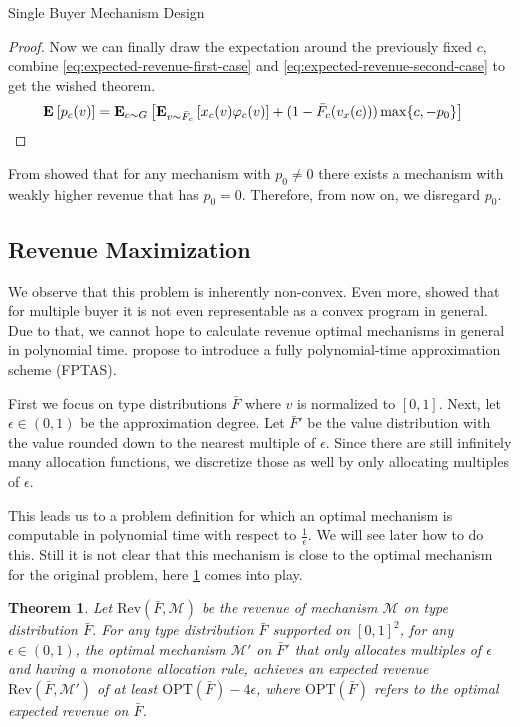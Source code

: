 \documentclass[11pt,a4paper]{article}
\newtheorem{theorem}{Theorem}
\newcommand{\Ex}[2][]{\mbox{\rm\bf E}_{#1}\left[#2\right]}
\newcommand{\1}[1]{\mbox{\rm\bf 1}_{#1}}
\begin{document}
\begin{section}{Single Buyer Mechanism Design}
\begin{proof}
     Now we can finally draw the expectation around the previously fixed $c$, combine \cref{eq:expected-revenue-first-case} and \cref{eq:expected-revenue-second-case} to get the wished theorem.
     \begin{align*}
         \Ex{p_c(v)} & = \Ex[c \sim G]{\Ex[v \sim \bar{F}_c]{x_c(v) \varphi_c(v)} + (1 - \bar{F}_{c}(v_x(c))) \max\{c, -p_0\} }
     \end{align*}
 \end{proof}

 From \citet{primary} showed that for any mechanism with $p_0 \neq 0$ there exists a mechanism with weakly higher revenue that has $p_0 = 0$.
 Therefore, from now on, we disregard $p_0$.

 \subsection{Revenue Maximization}
 \label{sec:revenue-maximization}

 We observe that this problem is inherently non-convex.
 Even more, \citet{primary} showed that for multiple buyer it is not even representable as a convex program in general.
 Due to that, we cannot hope to calculate revenue optimal mechanisms in general in polynomial time.
 \citet{primary} propose to introduce a fully polynomial-time approximation scheme (FPTAS).

 First we focus on type distributions $\bar{F}$ where $v$ is normalized to $[0,1]$.
 Next, let $\epsilon \in (0, 1)$ be the approximation degree.
 Let $\bar{F}'$ be the value distribution with the value rounded down to the nearest multiple of $\epsilon$.
 Since there are still infinitely many allocation functions, we discretize those as well by only allocating multiples of $\epsilon$.

 This leads us to a problem definition for which an optimal mechanism is computable in polynomial time with respect to $\frac{1}{\epsilon}$.
 We will see later how to do this.
 Still it is not clear that this mechanism is close to the optimal mechanism for the original problem, here \cref{theorem:approximation-guarantee} comes into play.

 \begin{theorem}
     \label{theorem:approximation-guarantee}
     Let $\mathrm{Rev}(\bar{F}, \mathcal{M})$ be the revenue of mechanism $\mathcal{M}$ on type distribution $\bar{F}$.
     For any type distribution $\bar{F}$ supported on $[0,1]^2$, for any $\epsilon \in (0,1)$,
     the optimal mechanism $\mathcal{M}'$ on $\bar{F}'$ that only allocates multiples of $\epsilon$ and having a monotone allocation rule, achieves an expected revenue $\mathrm{Rev}(\bar{F},\mathcal{M}')$ of at least
     $\mathrm{OPT}(\bar{F}) - 4\epsilon$, where $\mathrm{OPT}(\bar{F})$ refers to the optimal expected revenue on $\bar{F}$.
 \end{theorem}


\end{section}
\end{document}
